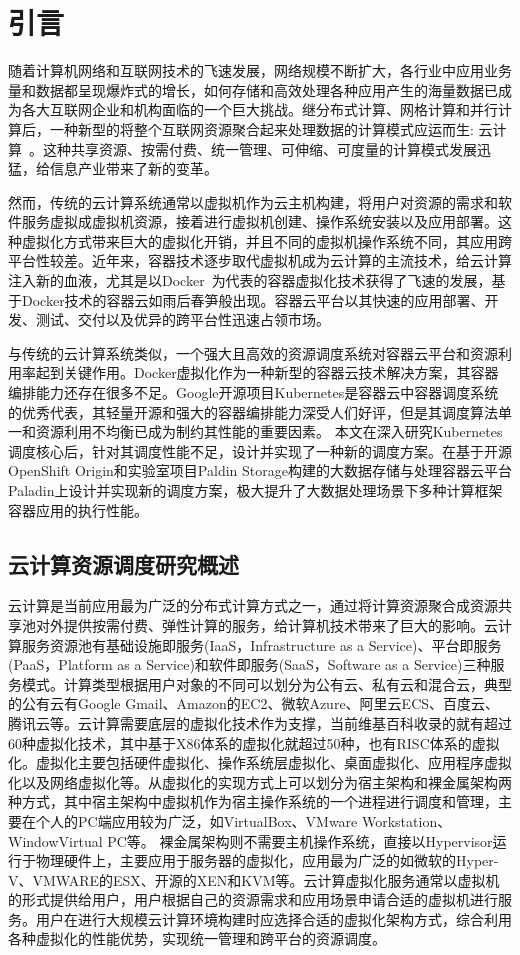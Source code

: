 \chapter{引言}
随着计算机网络和互联网技术的飞速发展，网络规模不断扩大，各行业中应用业务量和数据都呈现爆炸式的增长，如何存储和高效处理各种应用产生的海量数据已成为各大互联网企业和机构面临的一个巨大挑战。继分布式计算、网格计算和并行计算后，一种新型的将整个互联网资源聚合起来处理数据的计算模式应运而生: 云计算~\cite{Hayes2008Cloud}。这种共享资源、按需付费、统一管理、可伸缩、可度量的计算模式发展迅猛，给信息产业带来了新的变革。

然而，传统的云计算系统通常以虚拟机作为云主机构建，将用户对资源的需求和软件服务虚拟成虚拟机资源，接着进行虚拟机创建、操作系统安装以及应用部署。这种虚拟化方式带来巨大的虚拟化开销，并且不同的虚拟机操作系统不同，其应用跨平台性较差。近年来，容器技术逐步取代虚拟机成为云计算的主流技术，给云计算注入新的血液，尤其是以Docker~\cite{2015Docker}为代表的容器虚拟化技术获得了飞速的发展，基于Docker技术的容器云如雨后春笋般出现。容器云平台以其快速的应用部署、开发、测试、交付以及优异的跨平台性迅速占领市场。

与传统的云计算系统类似，一个强大且高效的资源调度系统对容器云平台和资源利用率起到关键作用。Docker虚拟化作为一种新型的容器云技术解决方案，其容器编排能力还存在很多不足。Google开源项目Kubernetes是容器云中容器调度系统的优秀代表，其轻量开源和强大的容器编排能力深受人们好评，但是其调度算法单一和资源利用不均衡已成为制约其性能的重要因素。
本文在深入研究Kubernetes调度核心后，针对其调度性能不足，设计并实现了一种新的调度方案。在基于开源OpenShift Origin和实验室项目Paldin Storage构建的大数据存储与处理容器云平台Paladin上设计并实现新的调度方案，极大提升了大数据处理场景下多种计算框架容器应用的执行性能。

\section{云计算资源调度研究概述}
云计算是当前应用最为广泛的分布式计算方式之一，通过将计算资源聚合成资源共享池对外提供按需付费、弹性计算的服务，给计算机技术带来了巨大的影响。云计算服务资源池有基础设施即服务(IaaS，Infrastructure as a Service)、平台即服务(PaaS，Platform as a Service)和软件即服务(SaaS，Software as a Service)三种服务模式。计算类型根据用户对象的不同可以划分为公有云、私有云和混合云，典型的公有云有Google Gmail、Amazon的EC2、微软Azure、阿里云ECS、百度云、腾讯云等。云计算需要底层的虚拟化技术作为支撑，当前维基百科收录的就有超过60种虚拟化技术，其中基于X86体系的虚拟化就超过50种，也有RISC体系的虚拟化。虚拟化主要包括硬件虚拟化、操作系统层虚拟化、桌面虚拟化、应用程序虚拟化以及网络虚拟化等。从虚拟化的实现方式上可以划分为宿主架构和裸金属架构两种方式，其中宿主架构中虚拟机作为宿主操作系统的一个进程进行调度和管理，主要在个人的PC端应用较为广泛，如VirtualBox、VMware Workstation、WindowVirtual PC等。
裸金属架构则不需要主机操作系统，直接以Hypervisor运行于物理硬件上，主要应用于服务器的虚拟化，应用最为广泛的如微软的Hyper-V、VMWARE的ESX、开源的XEN和KVM等。云计算虚拟化服务通常以虚拟机的形式提供给用户，用户根据自己的资源需求和应用场景申请合适的虚拟机进行服务。用户在进行大规模云计算环境构建时应选择合适的虚拟化架构方式，综合利用各种虚拟化的性能优势，实现统一管理和跨平台的资源调度。

